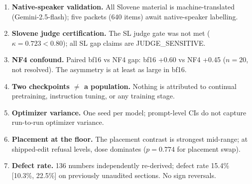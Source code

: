 \documentclass[11pt,letterpaper]{article}
\begin{document}
\begin{enumerate}
\item \textbf{Native-speaker validation.} All Slovene material is machine-translated (Gemini-2.5-flash); five packets (640 items) await native-speaker labelling.
\item \textbf{Slovene judge certification.} The SL judge gate was not met ($\kappa = 0.723 < 0.80$); all SL gap claims are JUDGE\_SENSITIVE.
\item \textbf{NF4 confound.} Paired bf16 vs NF4 gap: bf16 +0.60 vs NF4 +0.45 ($n = 20$, not resolved). The asymmetry is at least as large in bf16.
\item \textbf{Two checkpoints $\neq$ a population.} Nothing is attributed to continual pretraining, instruction tuning, or any training stage.
\item \textbf{Optimizer variance.} One seed per model; prompt-level CIs do not capture run-to-run optimizer variance.
\item \textbf{Placement at the floor.} The placement contrast is strongest mid-range; at shipped-edit refusal levels, dose dominates ($p = 0.774$ for placement swap).
\item \textbf{Defect rate.} 136 numbers independently re-derived; defect rate 15.4\% [10.3\%, 22.5\%] on previously unaudited sections. No sign reversals.
\end{enumerate}
\end{document}
